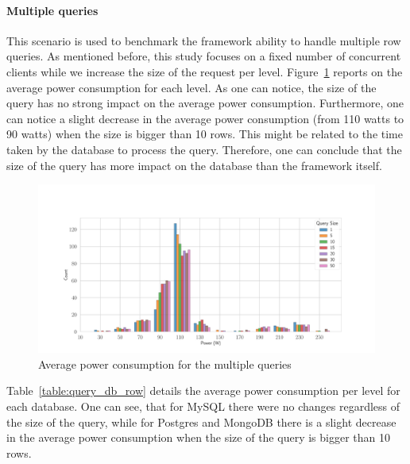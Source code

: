 \paragraph{Multiple queries}
This scenario is used to benchmark the framework ability to handle multiple row queries.
As mentioned before, this study focuses on a fixed number of concurrent clients while we increase the size of the request per level.
Figure~\ref{fig:av_power_query} reports on the average power consumption for each level.
As one can notice, the size of the query has no strong impact on the average power consumption.
Furthermore, one can notice a slight decrease in the average power consumption (from 110 watts to 90 watts) when the size is bigger than 10 rows.
This might be related to the time taken by the database to process the query.
Therefore, one can conclude that the size of the query has more impact on the database than the framework itself.

\begin{figure}[hbt]
    \centering
    \includegraphics[width=\textwidth,height=\textheight,keepaspectratio]{imgs/histogram_av_power_cpu_query}
    \caption{Average power consumption for the multiple queries }
    \label{fig:av_power_query}
\end{figure}

Table~\ref{table:query_db_row} details the average power consumption per level for each database.
One can see, that for MySQL there were no changes regardless of the size of the query, while for Postgres and MongoDB there is a slight decrease in the average power consumption when the size of the query is bigger than 10 rows.


